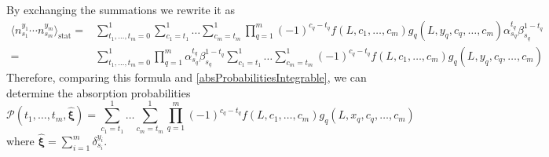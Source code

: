 \documentclass[10pt]{article}
\numberwithin{equation}{section}
\numberwithin{equation}{subsection}
\begin{document}
By exchanging the summations we rewrite it as 
\begin{equation}
\begin{split}
\langle n^{y_{1}}_{s_{1}}\cdots n^{y_{m}}_{s_{m}}\rangle_{\text{stat}}=&\sum_{t_{1},\ldots,t_{m}=0}^{1}
\sum_{c_{1}=t_{1}}^{1}\ldots\sum_{c_{m}=t_{m}}^{1}\prod_{q=1}^{m}(-1)^{c_{q}-t_{q}}f(L,c_{1},\ldots,c_{m})g_{q}(L,y_{q},c_{q},\ldots,c_{m})\alpha_{s_{q}}^{t_{q}}\beta_{s_{q}}^{1-t_{q}}\\
=&\sum_{t_{1},\ldots,t_{m}=0}^{1}\prod_{q=1}^{m}\alpha_{s_{q}}^{t_{q}}\beta_{s_{q}}^{1-t_{q}}\sum_{c_{1}=t_{1}}^{1}\ldots\sum_{c_{m}=t_{m}}^{1}(-1)^{c_{q}-t_{q}}f(L,c_{1},\ldots,c_{m})g_{q}(L,y_{q},c_{q},\ldots,c_{m})
\end{split}
\end{equation}
Therefore, comparing this formula and \eqref{absProbabilitiesIntegrable}, we can determine the absorption probabilities 
\begin{equation}
	\mathcal{P}(t_{1},\ldots,t_{m},\hat{\bm{\xi}})=\sum_{c_{1}=t_{1}}^{1}\ldots\sum_{c_{m}=t_{m}}^{1}\prod_{q=1}^{m}(-1)^{c_{q}-t_{q}}f(L,c_{1},\ldots,c_{m})g_{q}(L,x_{q},c_{q},\ldots,c_{m})
\end{equation}
where $\hat{\bm{\xi}}=\sum_{i=1}^{m}\delta_{s_{i}}^{y_{i}}$.  
\end{document}
